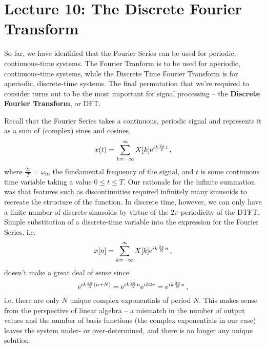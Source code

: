 \section{Lecture 10: The Discrete Fourier Transform}

So far, we have identified that the Fourier Series can be used for
periodic, continuous-time systems. The Fourier Tranform is to be
used for aperiodic, continuous-time systems, while the Discrete
Time Fourier Transform is for aperiodic, discrete-time systems.
The final permutation that we're required to consider turns out
to be the most important for signal processing -- the
\textbf{Discrete Fourier Transform}, or DFT.

Recall that the Fourier Series takes a continuous, periodic
signal and represents it as a sum of (complex) sines and cosines,
%
\begin{displaymath}
  x(t) = \sum_{k=-\infty}^\infty X[k]\mathrm{e}^{{i\mkern1mu} k\frac{2\pi}{T}t} \,,
\end{displaymath}
%
where $\frac{2\pi}{T} = \omega_0$, the fundamental frequency of the
signal, and $t$ is some continuous time variable taking a value
$0 \leq t \leq T$. Our rationale for the infinite summation was that
features such as discontinuities required infinitely many sinusoids
to recreate the structure of the function. In discrete time, however,
we can only have a finite number of discrete sinusoids by virtue of the
$2\pi$-periodicity of the DTFT. Simple substitution of a discrete-time
variable into the expression for the Fourier Series, i.e.
%
\begin{displaymath}
  x[n] = \sum_{k=-\infty}^\infty X[k]\mathrm{e}^{{i\mkern1mu} k\frac{2\pi}{N}n} \,,
\end{displaymath}
%
doesn't make a great deal of sense since
%
\begin{displaymath}
  \mathrm{e}^{{i\mkern1mu} k\frac{2\pi}{N}(n + N)} = \mathrm{e}^{{i\mkern1mu} k\frac{2\pi}{N}n}\mathrm{e}^{{i\mkern1mu} k2\pi}
  = \mathrm{e}^{{i\mkern1mu} k \frac{2\pi}{N}n} \,,
\end{displaymath}
%
i.e. there are only $N$ unique complex exponentials of period $N$. This
makes sense from the perspective of linear algebra -- a mismatch in the
number of output values and the number of basis functions (the complex
exponentials in our case) leaves the system under- or over-determined,
and there is no longer any unique solution.

